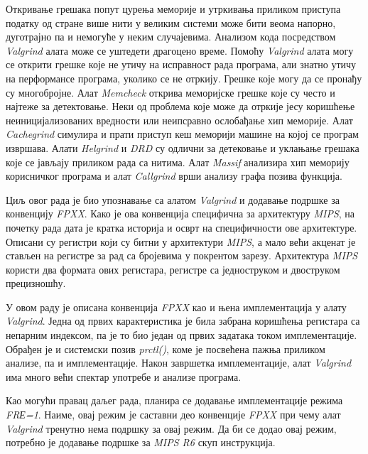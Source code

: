 \documentclass[12pt,oneside]{memoir}
\begin{document}
\indent Откривање грешака попут цурења меморије и утркивања приликом приступа податку од стране више нити у великим системи може бити веома напорно, дуготрајно па и немогуће у неким случајевима. Анализом кода посредством \textit{Valgrind} алата може се уштедети драгоцено време. Помоћу \textit{Valgrind} алата могу се открити грешке које не утичу на исправност рада програма, али знатно утичу на перформансе програма, уколико се не отркију. Грешке које могу да се пронађу су многобројне. Алат \textit{Memcheck} открива меморијске грешке које су често и најтеже за детектовање. Неки од проблема које може да отркије јесу коришћење неиницијализованих вредности или неипсравно ослобађање хип меморије. Алат \textit{Cachegrind} симулира и прати приступ кеш меморији машине на којој се програм  извршава. Алати \textit{Helgrind} и \textit{DRD} су одлични за детековање и уклањање грешака које се јављају приликом рада са нитима. Алат \textit{Massif} анализира хип меморију корисничког програма и алат \textit{Callgrind} врши анализу графа позива функција.

\indent Циљ овог рада је био упознавање са алатом \textit{Valgrind} и додавање подршке за конвенцију \textit{FPXX}. Како је ова конвенција специфична за архитектуру \textit{MIPS}, на почетку рада дата је кратка историја и осврт на специфичности ове архитектуре. Описани су регистри који су битни у архитектури \textit{MIPS}, а мало већи акценат је стављен на регистре за рад са бројевима у покрентом зарезу. Архитектура \textit{MIPS} користи два формата ових регистара, регистре са једноструком и двоструком прецизношћу.

\indent У овом раду је описана конвенција \textit{FPXX} као и њена имплементација у алату \textit{Valgrind}. Једна од првих карактеристика је била забрана коришћења регистара са непарним индексом, па је то био један од првих задатака током имплементације. Обрађен је и системски позив \textit{prctl()}, коме је посвећена пажња приликом анализе, па и имплементације. Након завршетка имплементације, алат \textit{Valgrind} има много већи спектар употребе и анализе програма.

\indent Као могући правац даљег рада, планира се додавање имплементације режима \textit{FRЕ=1}. Наиме, овај режим је саставни део конвенције \textit{FPXX} при чему алат \textit{Valgrind} тренутно нема подршку за овај режим. Да би се додао овај режим, потребно је додавање подршке за \textit{MIPS R6} скуп инструкција.


\end{document}
